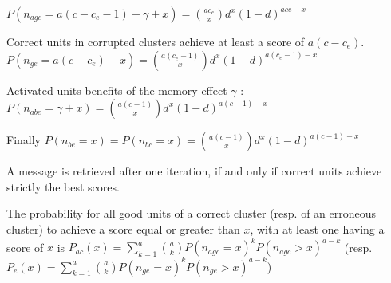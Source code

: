 \documentclass[english,10pt,twocolumn]{IEEEtran}
\theoremstyle{definition}
\begin{document}
	$P(n_{agc} = a(c - c_e - 1) + \gamma + x) = {a c_e \choose x} d^x (1-d)^{a ce-x}$
	
	Correct units in corrupted clusters achieve at least a score of $a(c - c_e)$. 
	$P(n_{ge} = a(c - c_e) + x) = {a (c_e - 1) \choose x} d^x (1-d)^{a (c_e - 1)-x}$
	
	
	Activated units benefits of the memory effect $\gamma$ :	\\
	$P(n_{abe} = \gamma + x) = {a(c - 1) \choose x} d^x (1-d)^{a(c-1)-x}$
	
	
	Finally $P(n_{be} = x) = P(n_{bc} = x) = {a(c - 1) \choose x} d^x (1-d)^{a(c- 1) -x}$	
	
	A message is retrieved after one iteration, if and only if correct units achieve strictly the best scores.	
	
	

	
	
	
	
	The probability for all good units of a correct cluster (resp. of an erroneous cluster) to achieve a score equal or greater than $x$, with at least one having a score of $x$ is $P_{ac} (x) = \sum_{k = 1}^{a} { a \choose k }   P(n_{agc} = x)^k P(n_{agc} > x)^{a-k}$ (resp. $P_e(x) = \sum_{k = 1}^a { a \choose k } P(n_{ge} = x)^k P(n_{ge} > x)^{a-k}$)
\end{document}
